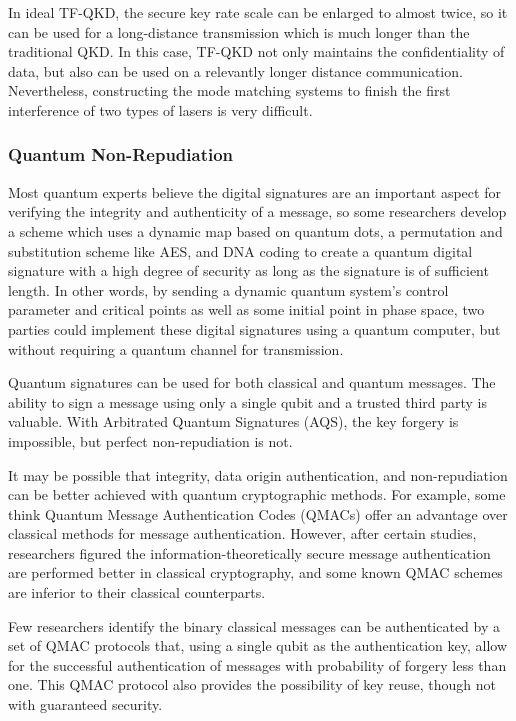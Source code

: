 \documentclass[sigconf]{acmart}
\begin{document}
In ideal TF-QKD, the secure key rate scale can be enlarged to almost twice, so it can be used for a long-distance transmission which is much longer than the traditional QKD. In this case, TF-QKD not only maintains the confidentiality of data, but also can be used on a relevantly longer distance communication. Nevertheless, constructing the mode matching systems to finish the first interference of two types of lasers is very difficult\cite{park_research_2020}.

\subsubsection{Quantum Non-Repudiation}
Most quantum experts believe the digital signatures are an important aspect for verifying the integrity and authenticity of a message, so some researchers develop a scheme which uses a dynamic map based on quantum dots, a permutation and substitution scheme like AES, and DNA coding to create a quantum digital signature with a high degree of security as long as the signature is of sufficient length. In other words, by sending a dynamic quantum system's control parameter and critical points as well as some initial point in phase space, two parties could implement these digital signatures using a quantum computer, but without requiring a quantum channel for transmission\cite{hematpour_presence_2020}.

Quantum signatures can be used for both classical and quantum messages. The ability to sign a message using only a single qubit and a trusted third party is valuable. With Arbitrated Quantum Signatures (AQS), the key forgery is impossible, but perfect non-repudiation is not\cite{kang_quantum_2015}.

It may be possible that integrity, data origin authentication, and non-repudiation can be better achieved with quantum cryptographic methods. For example, some think Quantum Message Authentication Codes (QMACs) offer an advantage over classical methods for message authentication. However, after certain studies, researchers figured the information-theoretically secure message authentication are performed better in classical cryptography, and some known QMAC schemes are inferior to their classical counterparts\cite{nikolopoulos_information-theoretically_2020}.

Few researchers identify the binary classical messages can be authenticated by a set of QMAC protocols that, using a single qubit as the authentication key, allow for the successful authentication of messages with probability of forgery less than one. This QMAC protocol also provides the possibility of key reuse, though not with guaranteed security\cite{curty_quantum_2001}.
\end{document}
